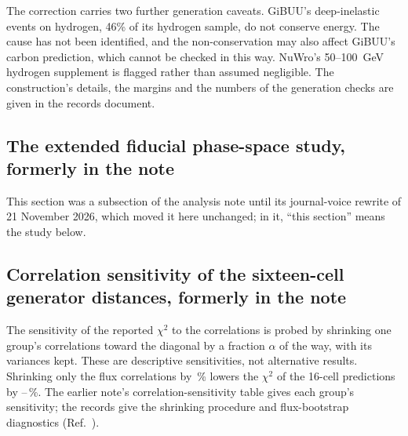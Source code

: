 The correction carries two further generation caveats. GiBUU's deep-inelastic events on hydrogen, 46\% of its hydrogen sample, do not conserve energy. The cause has not been identified, and the non-conservation may also affect GiBUU's carbon prediction, which cannot be checked in this way. NuWro's 50--\SI{100}{GeV} hydrogen supplement is flagged rather than assumed negligible. The construction's details, the margins and the numbers of the generation checks are given in the records document.


\subsection{The extended fiducial phase-space study, formerly in the note}
This section was a subsection of the analysis note until its journal-voice rewrite of 21 November 2026, which moved it here unchanged; in it, ``this section'' means the study below.


\subsection{Correlation sensitivity of the sixteen-cell generator distances, formerly in the note}
The sensitivity of the reported $\chi^2$ to the correlations is probed by shrinking one group's correlations toward the diagonal by a fraction $\alpha$ of the way, with its variances kept. These are descriptive sensitivities, not alternative results. Shrinking only the flux correlations by \,\% lowers the $\chi^2$ of the 16-cell predictions by --\,\%. The earlier note's correlation-sensitivity table gives each group's sensitivity; the records give the shrinking procedure and flux-bootstrap diagnostics (Ref.~\cite{NoteRecords2026}).
